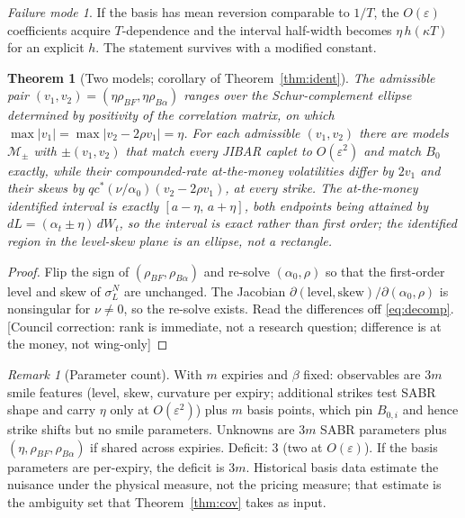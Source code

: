 \documentclass[11pt,a4paper]{article}
\newcommand{\corr}[1]{{\color{ox}\textsf{\small [Council correction: #1]}}}
\theoremstyle{plain}
\newtheorem{theorem}{Theorem}
\theoremstyle{definition}
\theoremstyle{remark}
\newtheorem*{remark}{Remark}
\newtheorem*{failure}{Failure mode}
\begin{document}
\begin{failure}
If the basis has mean reversion comparable to $1/T$, the $O(\varepsilon)$ coefficients acquire $T$-dependence and the interval half-width becomes $\eta\,h(\kappa T)$ for an explicit $h$. The statement survives with a modified constant.
\end{failure}

\begin{theorem}[Two models; corollary of Theorem~\ref{thm:ident}]\label{thm:two}
The admissible pair $(v_1,v_2)=(\eta\rho_{BF},\eta\rho_{B\alpha})$ ranges over the Schur-complement ellipse determined by positivity of the correlation matrix, on which $\max|v_1|=\max|v_2-2\rho v_1|=\eta$. For each admissible $(v_1,v_2)$ there are models $\mathcal M_\pm$ with $\pm(v_1,v_2)$ that match every JIBAR caplet to $O(\varepsilon^2)$ and match $B_0$ exactly, while their compounded-rate at-the-money volatilities differ by $2v_1$ and their skews by $qc^*(\nu/\alpha_0)(v_2-2\rho v_1)$, at every strike. The at-the-money identified interval is exactly $[a-\eta,\,a+\eta]$, both endpoints being attained by $dL=(\alpha_t\pm\eta)\,dW_t$, so the interval is exact rather than first order; the identified region in the level-skew plane is an ellipse, not a rectangle.
\end{theorem}
\begin{proof}
Flip the sign of $(\rho_{BF},\rho_{B\alpha})$ and re-solve $(\alpha_0,\rho)$ so that the first-order level and skew of $\sigma^N_L$ are unchanged. The Jacobian $\partial(\text{level},\text{skew})/\partial(\alpha_0,\rho)$ is nonsingular for $\nu\ne0$, so the re-solve exists. Read the differences off \eqref{eq:decomp}. \corr{rank is immediate, not a research question; difference is at the money, not wing-only}
\end{proof}
\begin{remark}[Parameter count]
With $m$ expiries and $\beta$ fixed: observables are $3m$ smile features (level, skew, curvature per expiry; additional strikes test SABR shape and carry $\eta$ only at $O(\varepsilon^2)$) plus $m$ basis points, which pin $B_{0,i}$ and hence strike shifts but no smile parameters. Unknowns are $3m$ SABR parameters plus $(\eta,\rho_{BF},\rho_{B\alpha})$ if shared across expiries. Deficit: $3$ (two at $O(\varepsilon)$). If the basis parameters are per-expiry, the deficit is $3m$. Historical basis data estimate the nuisance under the physical measure, not the pricing measure; that estimate is the ambiguity set that Theorem~\ref{thm:cov} takes as input.
\end{remark}
\end{document}

